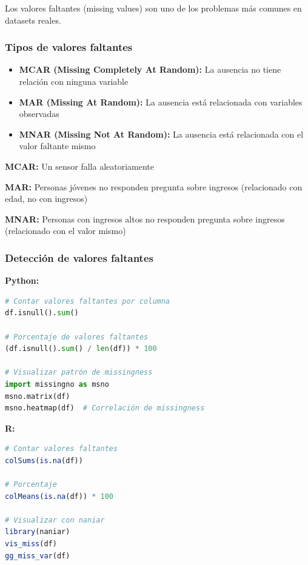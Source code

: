\documentclass[a4paper,11pt]{article}
\begin{document}
Los valores faltantes (missing values) son uno de los problemas más comunes en datasets reales.

\subsubsection{Tipos de valores faltantes}

\begin{itemize}
    \item \textbf{MCAR (Missing Completely At Random):} La ausencia no tiene relación con ninguna variable
    \item \textbf{MAR (Missing At Random):} La ausencia está relacionada con variables observadas
    \item \textbf{MNAR (Missing Not At Random):} La ausencia está relacionada con el valor faltante mismo
\end{itemize}

\begin{tcolorbox}[colback=ejemplocolor!20, colframe=unidadcolor, title=Ejemplos de tipos de missingness]
\textbf{MCAR:} Un sensor falla aleatoriamente

\textbf{MAR:} Personas jóvenes no responden pregunta sobre ingresos (relacionado con edad, no con ingresos)

\textbf{MNAR:} Personas con ingresos altos no responden pregunta sobre ingresos (relacionado con el valor mismo)
\end{tcolorbox}

\subsubsection{Detección de valores faltantes}

\textbf{Python:}
\begin{lstlisting}[language=Python]
# Contar valores faltantes por columna
df.isnull().sum()

# Porcentaje de valores faltantes
(df.isnull().sum() / len(df)) * 100

# Visualizar patrón de missingness
import missingno as msno
msno.matrix(df)
msno.heatmap(df)  # Correlación de missingness
\end{lstlisting}

\textbf{R:}
\begin{lstlisting}[language=R]
# Contar valores faltantes
colSums(is.na(df))

# Porcentaje
colMeans(is.na(df)) * 100

# Visualizar con naniar
library(naniar)
vis_miss(df)
gg_miss_var(df)
\end{lstlisting}
\end{document}
